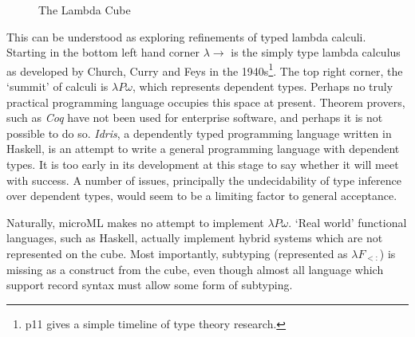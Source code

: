\documentclass[12pt, a4paper]{report}
\begin{document}
\begin{figure} %
    \centering
    \caption{The Lambda Cube}
    \label{fig:cube}
\end{figure}

This can be understood as exploring refinements of typed lambda calculi. Starting in the bottom
left hand corner $\lambda \rightarrow$ is the simply type lambda calculus as developed by Church,
Curry and Feys in the 1940s\footnote{\cite{Pierce:2002:TPL:509043} p11 gives a simple timeline
of type theory research.}. The top right corner, the `summit' of calculi is $\lambda P \omega$,
which represents \gls{dependent types}. Perhaps no truly practical programming language occupies this
space at present. Theorem provers, such as \textit{\gls{Coq}} have not been used for enterprise software,
and perhaps it is not possible to do so. \textit{Idris}, a dependently typed programming language
written in Haskell, is an attempt to write a general programming language with dependent types. It
is too early in its development at this stage to say whether it will meet with success. A number of
issues, principally the undecidability of type inference over dependent types, would seem to be a
limiting factor to general acceptance.

Naturally, microML makes no attempt to implement $\lambda P\omega$. `Real world' functional
languages, such as Haskell, actually implement hybrid systems which are not represented on the cube.
Most importantly, subtyping (represented as $\lambda F_{<:}$) is missing as a construct from the cube, 
even though almost all language which support record syntax must allow some form of subtyping.
\end{document}
